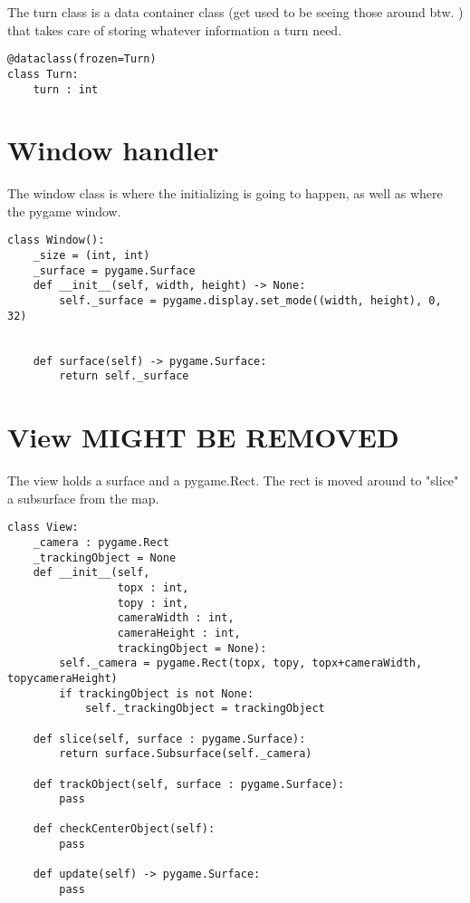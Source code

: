 \documentclass[11pt]{article}
\begin{document}
The turn class is a data container class (get used to be seeing those around btw. ) that takes care of storing whatever information a turn need.
\begin{verbatim}
@dataclass(frozen=Turn)
class Turn:
    turn : int
\end{verbatim}


\section{Window handler}
\label{sec:org48075b0}

The window class is where the initializing is going to happen, as well as where the pygame window.


\begin{verbatim}
class Window():
    _size = (int, int)
    _surface = pygame.Surface
    def __init__(self, width, height) -> None:
        self._surface = pygame.display.set_mode((width, height), 0, 32)

        
    def surface(self) -> pygame.Surface:
        return self._surface
\end{verbatim}


\section{View MIGHT BE REMOVED}
\label{sec:org451206e}

The view holds a surface and a pygame.Rect. The rect is moved around to "slice" a subsurface from the map. 



\begin{verbatim}
class View:
    _camera : pygame.Rect
    _trackingObject = None
    def __init__(self,
                 topx : int,
                 topy : int,
                 cameraWidth : int,
                 cameraHeight : int,
                 trackingObject = None):
        self._camera = pygame.Rect(topx, topy, topx+cameraWidth, topycameraHeight)
        if trackingObject is not None:
            self._trackingObject = trackingObject

    def slice(self, surface : pygame.Surface):
        return surface.Subsurface(self._camera)

    def trackObject(self, surface : pygame.Surface):
        pass

    def checkCenterObject(self):
        pass

    def update(self) -> pygame.Surface:
        pass
\end{verbatim}
\end{document}
